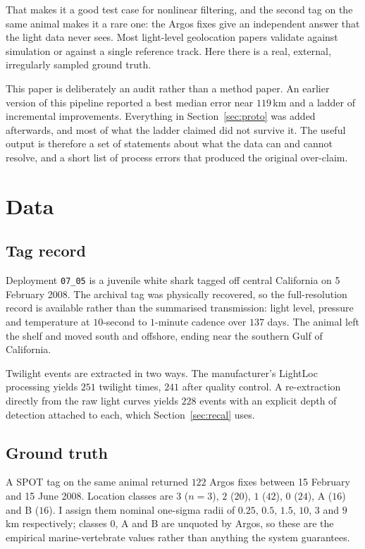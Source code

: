 \documentclass[conference]{IEEEtran}
\begin{document}
That makes it a good test case for nonlinear filtering, and the second tag on
the same animal makes it a rare one: the Argos fixes give an independent answer
that the light data never sees. Most light-level geolocation papers validate
against simulation or against a single reference track. Here there is a real,
external, irregularly sampled ground truth.

This paper is deliberately an audit rather than a method paper. An earlier
version of this pipeline reported a best median error near $119$\,\si{\km} and a
ladder of incremental improvements. Everything in Section~\ref{sec:proto} was
added afterwards, and most of what the ladder claimed did not survive it. The
useful output is therefore a set of statements about what the data can and
cannot resolve, and a short list of process errors that produced the original
over-claim.

\section{Data}
\subsection{Tag record}
Deployment \texttt{07\_05} is a juvenile white shark tagged off central
California on 5 February 2008. The archival tag was physically recovered, so the
full-resolution record is available rather than the summarised transmission:
light level, pressure and temperature at $10$-second to $1$-minute cadence over
$137$ days. The animal left the shelf and moved south and offshore, ending near
the southern Gulf of California.

Twilight events are extracted in two ways. The manufacturer's LightLoc
processing yields $251$ twilight times, $241$ after quality control. A
re-extraction directly from the raw light curves yields $228$ events with an
explicit depth of detection attached to each, which Section~\ref{sec:recal}
uses.

\subsection{Ground truth}
A SPOT tag on the same animal returned $122$ Argos fixes between
15 February and 15 June 2008. Location classes are $3$ ($n=3$), $2$ ($20$),
$1$ ($42$), $0$ ($24$), A ($16$) and B ($16$). I assign them nominal
one-sigma radii of $0.25$, $0.5$, $1.5$, $10$, $3$ and $9$\,\si{\km}
respectively; classes 0, A and B are unquoted by Argos, so these are the
empirical marine-vertebrate values rather than anything the system guarantees.
\end{document}

